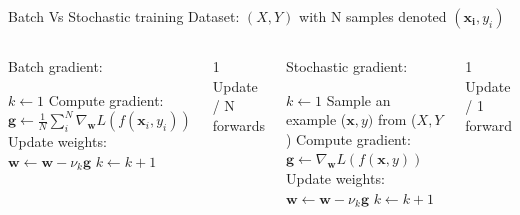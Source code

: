 \documentclass[handout]{beamer}
\begin{document}
\begin{frame}{Batch Vs Stochastic training}
Dataset: $(X,Y)$ with N samples denoted $(\mathbf{x_i},y_i)$

\begin{columns}[t]
\begin{footnotesize}
\begin{block}{Batch gradient:}\end{block}
    \begin{algorithmic}
    \State $k \leftarrow 1$
    \State Compute gradient: $\mathbf{g} \leftarrow \frac{1}{N}\sum_i^N\nabla_\mathbf{w}L(f(\mathbf{x}_i,y_i))$
    \State Update weights: $\mathbf{w} \leftarrow \mathbf{w} - \nu_k\mathbf{g}$
    \State $k \leftarrow k + 1$
    \EndWhile 
    \end{algorithmic}
    \end{footnotesize}
    \alert{1 Update / N forwards}
    \pause
\begin{footnotesize}
\begin{block}{Stochastic gradient:}\end{block}
    \begin{algorithmic}
    \State $k \leftarrow 1$
    \State Sample an example ($\mathbf{x},y)$ from ($X,Y$)
    \State Compute gradient: $\mathbf{g} \leftarrow \nabla_\mathbf{w}L(f(\mathbf{x},y))$
    \State Update weights: $\mathbf{w} \leftarrow \mathbf{w} - \nu_k\mathbf{g}$
    \State $k \leftarrow k + 1$
    \EndWhile 
    \end{algorithmic}
    \end{footnotesize}
    \alert{1 Update / 1 forward}
    
    
    \end{columns}
\end{frame}
\end{document}
